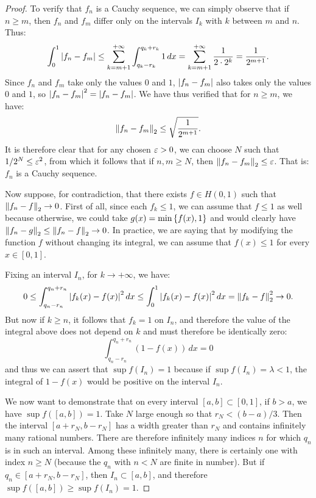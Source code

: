 \begin{proof}
To verify that $f_n$ is a Cauchy sequence, we can simply observe that if $n\ge
m$, then $f_n$ and $f_m$ differ only on the intervals $I_k$ with $k$ between $m$
and $n$. Thus:
\[
  \int_0^1 {\left|f_n - f_m\right|}
  \le \sum_{k=m+1}^{+\infty} \int_{q_k-r_k}^{q_k+r_k} 1\,dx
  = \sum_{k=m+1}^{+\infty}\frac{1}{2\cdot 2^k} = \frac{1}{2^{m+1}}.
\]
Since $f_n$ and $f_m$ take only the values $0$ and $1$, ${\left|f_n-f_m\right|}$ also
takes only the values $0$ and $1$, so ${\left|f_n-f_m\right|}^2={\left|f_n-f_m\right|}$. We have
thus verified that for $n\ge m$, we have:
\[
  {\left\Vert  f_n - f_m\right\Vert}_2 \le \sqrt{\frac{1}{2^{m+1}}}.
\]
It is therefore clear that for any chosen $\varepsilon>0$, we can choose $N$ such that
$1/2^N \le \varepsilon^2$, from which it follows that if $n,m\ge N$, then
${\left\Vert f_n-f_m\right\Vert}_2 \le \varepsilon$. That is: $f_n$ is a Cauchy sequence.

Now suppose, for contradiction, that there exists $f\in H(0,1)$ such that
${\left\Vert f_n-f\right\Vert}_2 \to 0$. First of all, since each $f_k\le 1$, we can assume that
$f\le 1$ as well because otherwise, we could take $g(x) = \min{\left\{ f(x),1 \right\}}$
and would clearly have ${\left\Vert f_n - g\right\Vert}_2 \le {\left\Vert f_n -f\right\Vert}_2 \to 0$. In practice,
we are saying that by modifying the function $f$ without changing its integral,
we can assume that $f(x)\le 1$ for every $x\in[0,1]$.

Fixing an interval $I_n$, for $k\to +\infty$, we have:
\[
  0\le \int_{q_n-r_n}^{q_n+r_n}{\left|f_k(x)-f(x)\right|}^2\, dx
  \le \int_0^1 {\left|f_k(x)-f(x)\right|}^2\, dx = {\left\Vert  f_k -f\right\Vert}_2^2 \to 0.
\]
But now if $k\ge n$, it follows that $f_k=1$ on $I_n$, and therefore the value
of the integral above does not depend on $k$ and must therefore be identically
zero:
\[
  \int_{q_n-r_n}^{q_n+r_n} (1-f(x)) \, dx = 0
\]
and thus we can assert that $\sup f(I_n) = 1$ because if $\sup f(I_n) = \lambda
< 1$, the integral of $1-f(x)$ would be positive on the interval $I_n$.

We now want to demonstrate that on every interval $[a,b]\subset[0,1]$, if $b>a$,
we have $\sup f([a,b])=1$. Take $N$ large enough so that $r_N < (b-a)/3$. Then
the interval $[a+r_N, b-r_N]$ has a width greater than $r_N$ and contains
infinitely many rational numbers. There are therefore infinitely many indices
$n$ for which $q_n$ is in such an interval. Among these infinitely many, there
is certainly one with index $n\ge N$ (because the $q_n$ with $n<N$ are finite in
number). But if $q_n \in [a+r_N,b-r_N]$, then $I_n\subset[a,b]$, and therefore
$\sup f([a,b])\ge \sup f(I_n) = 1$.


\end{proof}
